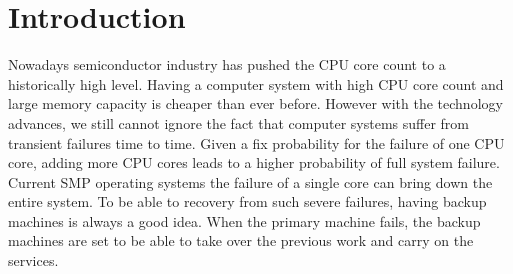 \chapter{Introduction}





Nowadays semiconductor industry has pushed the CPU core count to a historically high level. Having a computer system with high CPU core count and large memory capacity is cheaper than ever before. However with the technology advances, we still cannot ignore the fact that computer systems suffer from transient failures time to time. Given a fix probability for the failure of one CPU core, adding more CPU cores leads to a higher probability of full system failure. Current SMP operating systems the failure of a single core can bring down the entire system. To be able to recovery from such severe failures, having backup machines is always a good idea. When the primary machine fails, the backup machines are set to be able to take over the previous work and carry on the services.

